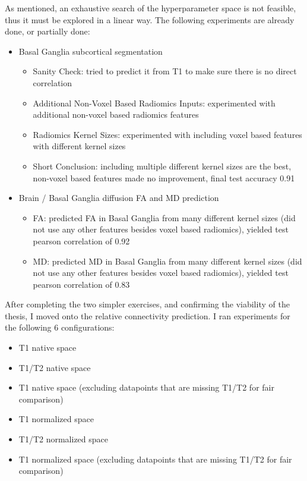 As mentioned, an exhaustive search of the hyperparameter space is not feasible, thus it must be explored in a linear way. The following experiments are already done, or partially done:

\begin{itemize}
  \item Basal Ganglia subcortical segmentation
  \begin{itemize}
    \item Sanity Check: tried to predict it from T1 to make sure there is no direct correlation
    \item Additional Non-Voxel Based Radiomics Inputs: experimented with additional non-voxel based radiomics features
    \item Radiomics Kernel Sizes: experimented with including voxel based features with different kernel sizes
    \item Short Conclusion: including multiple different kernel sizes are the best, non-voxel based features made no improvement, final test accuracy 0.91
  \end{itemize}
  \item Brain / Basal Ganglia diffusion \ac{FA} and \ac{MD} prediction
  \begin{itemize}
    \item \ac{FA}: predicted \ac{FA} in Basal Ganglia from many different kernel sizes (did not use any other features besides voxel based radiomics), yielded test pearson correlation of 0.92
    \item \ac{MD}: predicted \ac{MD} in Basal Ganglia from many different kernel sizes (did not use any other features besides voxel based radiomics), yielded test pearson correlation of 0.83
  \end{itemize}
\end{itemize}

After completing the two simpler exercises, and confirming the viability of the thesis, I moved onto the relative connectivity prediction. I ran experiments for the following 6 configurations:

\begin{itemize}
  \item T1 native space
  \item T1/T2 native space
  \item T1 native space (excluding datapoints that are missing T1/T2 for fair comparison)
  \item T1 normalized space
  \item T1/T2 normalized space
  \item T1 normalized space (excluding datapoints that are missing T1/T2 for fair comparison)
\end{itemize}

